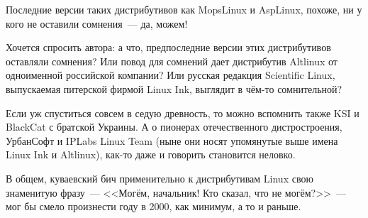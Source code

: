\begin{shadequote}{}
Последние версии таких дистрибутивов как MopsLinux и AspLinux, похоже, ни у кого не оставили сомнения~--- да, можем!
\end{shadequote}
Хочется спросить автора: а что, предпоследние версии этих дистрибутивов оставляли сомнения? Или повод для сомнений дает дистрибутив Altlinux от одноименной российской компании? Или русская редакция Scientific Linux, выпускаемая питерской фирмой Linux Ink, выглядит в чём-то сомнительной? 

Если уж спуститься совсем в седую древность, то можно вспомнить также KSI и BlackCat с братской Украины. А о пионерах отечественного дистростроения, УрбанСофт и IPLabs Linux Team (ныне они носят упомянутые выше имена Linux Ink и Altlinux), как-то даже и говорить становится неловко. 

В общем, куваевский бич применительно к дистрибутивам Linux свою знаменитую фразу~--- <<Могём, начальник! Кто сказал, что не могём?>>~--- мог бы смело произнести году в 2000, как минимум, а то и раньше. 

